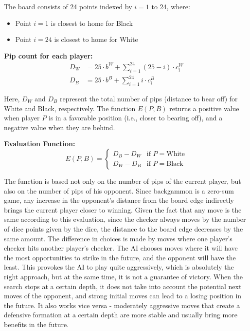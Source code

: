 The board consists of 24 points indexed by $i = 1$ to $24$, where:
\begin{itemize}
    \item Point $i = 1$ is closest to home for Black
    \item Point $i = 24$ is closest to home for White
\end{itemize}

\vspace{1em}

\textbf{Pip count for each player:}
\begin{align*}
D_W &= 25 \cdot b^W + \sum_{i=1}^{24} (25 - i) \cdot c_i^W \\
D_B &= 25 \cdot b^B + \sum_{i=1}^{24} i \cdot c_i^B
\end{align*}

Here, $D_W$ and $D_B$ represent the total number of pips (distance to bear off) for White and Black, respectively. The function $E(P, B)$ returns a positive value when player $P$ is in a favorable position (i.e., closer to bearing off), and a negative value when they are behind.

\vspace{1em}

\textbf{Evaluation Function:}
\[
E(P, B) = 
\begin{cases}
D_B - D_W & \text{if } P = \text{White} \\
D_W - D_B & \text{if } P = \text{Black}
\end{cases}
\]



The function is based not only on the number of pips of the current player, but also on the number of pips of his opponent. Since backgammon is a zero-sum game, any increase in the opponent's distance from the board edge indirectly brings the current player closer to winning. Given the fact that any move is the same according to this evaluation, since the checker always moves by the number of dice points given by the dice, the distance to the board edge decreases by the same amount. The difference in choices is made by moves where one player's checker hits another player's checker. The AI chooses moves where it will have the most opportunities to strike in the future, and the opponent will have the least. This provokes the AI to play quite aggressively, which is absolutely the right approach, but at the same time, it is not a guarantee of victory. When the search stops at a certain depth, it does not take into account the potential next moves of the opponent, and strong initial moves can lead to a losing position in the future. It also works vice versa - moderately aggressive moves that create a defensive formation at a certain depth are more stable and usually bring more benefits in the future.

